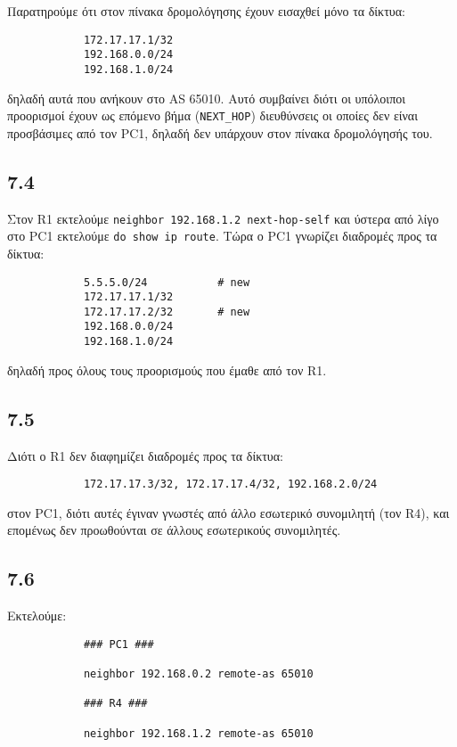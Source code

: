 \documentclass[a4paper, 12pt]{article}
\begin{document}
		Παρατηρούμε ότι στον πίνακα δρομολόγησης έχουν εισαχθεί μόνο τα δίκτυα:
		
		\begin{verbatim}
			172.17.17.1/32
			192.168.0.0/24
			192.168.1.0/24
		\end{verbatim}
		
		δηλαδή αυτά που ανήκουν στο AS 65010. Αυτό συμβαίνει διότι οι υπόλοιποι προορισμοί έχουν ως επόμενο βήμα (\verb|NEXT_HOP|) διευθύνσεις οι οποίες δεν είναι προσβάσιμες από τον PC1, δηλαδή δεν υπάρχουν στον πίνακα δρομολόγησής του.
		
	\subsection*{7.4}
		Στον R1 εκτελούμε \verb|neighbor 192.168.1.2 next-hop-self| και ύστερα από λίγο στο PC1 εκτελούμε \verb|do show ip route|. Τώρα ο PC1 γνωρίζει διαδρομές προς τα δίκτυα:
		
		\begin{verbatim}
			5.5.5.0/24           # new 
			172.17.17.1/32
			172.17.17.2/32       # new 
			192.168.0.0/24
			192.168.1.0/24
		\end{verbatim}
		
		δηλαδή προς όλους τους προορισμούς που έμαθε από τον R1.

	\subsection*{7.5}
		Διότι ο R1 δεν διαφημίζει διαδρομές προς τα δίκτυα:
		
		\begin{verbatim}
			172.17.17.3/32, 172.17.17.4/32, 192.168.2.0/24
		\end{verbatim} 
		
		στον PC1, διότι αυτές έγιναν γνωστές από άλλο εσωτερικό συνομιλητή (τον R4), και επομένως δεν προωθούνται σε άλλους εσωτερικούς συνομιλητές.

	\subsection*{7.6}
		Εκτελούμε: 
		
		\begin{verbatim}
			### PC1 ###
			
			neighbor 192.168.0.2 remote-as 65010
			
			### R4 ###
			
			neighbor 192.168.1.2 remote-as 65010
		\end{verbatim}
\end{document}
